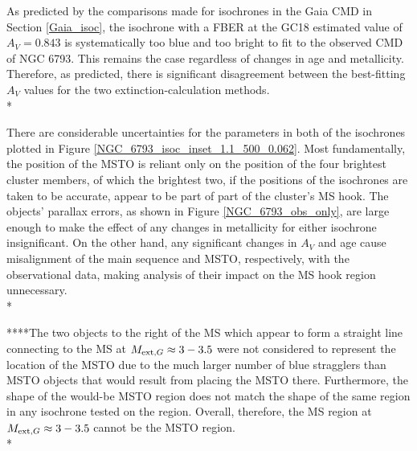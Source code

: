 \documentclass[12pt, a4paper]{report}
\begin{document}
As predicted by the comparisons made for isochrones in the Gaia CMD in Section \ref{Gaia_isoc}, the isochrone with a FBER at the GC18 estimated value of $A_{V} = 0.843$ is systematically too blue and too bright to fit to the observed CMD of NGC 6793. This remains the case regardless of changes in age and metallicity. Therefore, as predicted, there is significant disagreement between the best-fitting $A_{V}$ values for the two extinction-calculation methods.\\*

There are considerable uncertainties for the parameters in both of the isochrones plotted in Figure \ref{NGC_6793_isoc_inset_1.1_500_0.062}. Most fundamentally, the position of the MSTO is reliant only on the position of the four brightest cluster members, of which the brightest two, if the positions of the isochrones are taken to be accurate, appear to be part of part of the cluster's MS hook. The objects' parallax errors, as shown in Figure \ref{NGC_6793_obs_only}, are large enough to make the effect of any changes in metallicity for either isochrone insignificant. On the other hand, any significant changes in $A_{V}$ and age cause misalignment of the main sequence and MSTO, respectively, with the observational data, making analysis of their impact on the MS hook region unnecessary.\\*


****The two objects to the right of the MS which appear to form a straight line connecting to the MS at $M_{\textnormal{ext},G} \approx 3-3.5$ were not considered to represent the location of the MSTO due to the much larger number of blue stragglers than MSTO objects that would result from placing the MSTO there. Furthermore, the shape of the would-be MSTO region does not match the shape of the same region in any isochrone tested on the region. Overall, therefore, the MS region at $M_{\textnormal{ext},G} \approx 3-3.5$ cannot be the MSTO region.\\*
\end{document}

